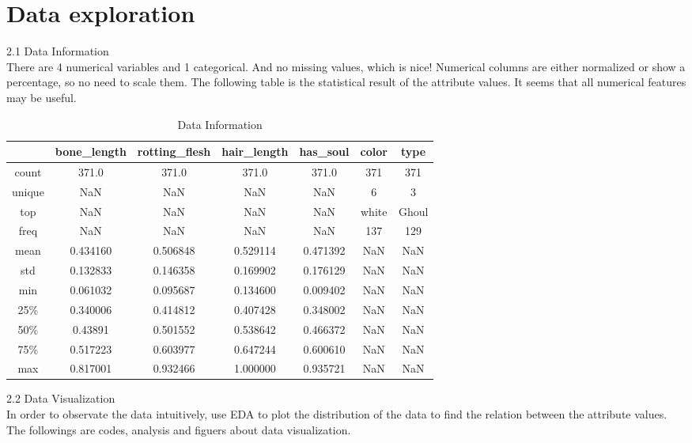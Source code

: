 \section{Data exploration} \label{sec-data_exploration}

2.1 Data Information\\
\hspace*{0.4cm}There are 4 numerical variables and 1 categorical. And no missing values, which is nice! Numerical columns are either normalized or show a percentage, so no need to scale them. The following table is the statistical result of the attribute values.
It seems that all numerical features may be useful.\\
\begin{table}[h]  \centering
	\caption{Data Information}
	\label{tbl:data information}
	\begin{tabular}{ccccccc}
		\hline
		& bone_length & rotting_flesh & hair_length & has_soul & color & type\\
		\hline
		count & 371.0 & 371.0 & 371.0 & 371.0 & 371 & 371 \\
		unique & NaN & NaN & NaN & NaN & 6 & 3 \\
		top & NaN & NaN & NaN & NaN & white & Ghoul \\
		freq & NaN & NaN & NaN & NaN & 137 & 129\\
		mean & 0.434160 & 0.506848 & 0.529114 & 0.471392 & NaN & NaN \\
		std & 0.132833 & 0.146358 & 0.169902 & 0.176129 & NaN & NaN \\
		min & 0.061032 & 0.095687 & 0.134600 & 0.009402 & NaN & NaN \\
		25\% & 0.340006 & 0.414812 & 0.407428 & 0.348002 & NaN & NaN \\
		50\% & 0.43891 & 0.501552 & 0.538642 & 0.466372 & NaN & NaN\\
		75\% & 0.517223 & 0.603977 & 0.647244 & 0.600610 & NaN & NaN\\
		max &  0.817001 & 0.932466 & 1.000000 & 0.935721 & NaN & NaN\\
		\hline 
	\end{tabular}
\end{table}
\hspace*{0.1cm}2.2 Data Visualization\\
\hspace*{0.4cm}In order to observate the data intuitively, use EDA to plot the distribution of the data to find the relation between the attribute values. The followings are codes, analysis and figuers about data visualization.\\
